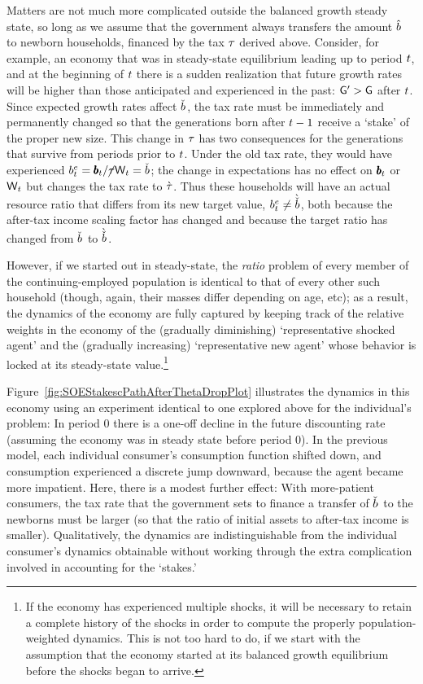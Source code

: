 \documentclass{handout}
\begin{document}
Matters are not much more complicated outside the balanced growth
steady state, so long as we assume that the government always
transfers the amount $\hat{b}^{\null}$ to newborn households, financed by
the tax $\tau$ derived above.  Consider, for example, an economy that
was in steady-state equilibrium leading up to period $t$, and at
the beginning of $t$ there is a sudden realization that future
growth rates will be higher than those anticipated and experienced in
the past: $\mathsf{G}^{\prime} > \mathsf{G}$ after $t$.  Since expected
growth rates affect $\bTarg^{\null}$, the tax rate must be immediately and
permanently changed so that the generations born after $t-1$
receive a `stake' of the proper new size.  This change in $\tau$ has
two consequences for the generations that survive from periods prior
to $t$.  Under the old tax rate, they would have experienced
$\bE_{t} = \bLev_{t}/\TaxFree\Wage_{t} = \bTarg^{\null}$; the change in
expectations has no effect on $\pmb{b}_{t}$ or $\mathsf{W}_{t}$ but changes
the tax rate to $\grave{\tau}$.  Thus these households will have an
actual resource ratio that differs from its new target value, $\bE_{t}
\neq \Alt{\bTarg}^{\null}$, both because the after-tax income scaling factor
has changed and because the target ratio has changed from $\bTarg^{\null}$
to $\Alt{\bTarg}^{\null}$.

However, if we started out in steady-state, the {\it ratio} problem of every
member of the continuing-employed population is identical to that of every 
other such household (though, again, their masses differ depending on age, etc); as a result, the dynamics of the economy are fully captured
by keeping track of the relative weights in the economy of the (gradually diminishing) `representative shocked agent' and the (gradually increasing) `representative new agent' 
whose behavior is locked at its steady-state value.\footnote{
If the economy has experienced multiple shocks, it will be necessary to
retain a complete history of the shocks in order to compute the properly 
population-weighted dynamics.  This is not too hard to do, if we start with
the assumption that the economy started at its balanced growth equilibrium before the shocks began to arrive.}

Figure~\ref{fig:SOEStakescPathAfterThetaDropPlot} illustrates the
dynamics in this economy using an experiment identical to one explored
above for the individual's problem: In period 0 there is a one-off
decline in the future discounting rate (assuming the economy was in
steady state before period 0).  In the previous model, each individual
consumer's consumption function shifted down, and consumption
experienced a discrete jump downward, because the agent became more
impatient.  Here, there is a modest further effect: With
more-patient consumers, the tax rate that the government sets to finance a transfer
of $\bTarg^{\null}$ to the newborns must be larger (so that the ratio of initial assets to
after-tax income is smaller).  Qualitatively, the
dynamics are indistinguishable from the individual consumer's dynamics
obtainable without working through the extra complication involved in
accounting for the `stakes.'
\end{document}
